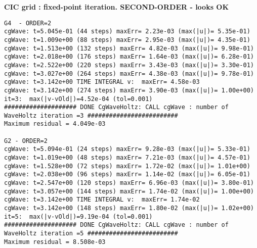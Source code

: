 \documentclass[preprint,11pt]{elsarticle}
\begin{document}
\bigskip
\textbf{CIC grid  : fixed-point iteration. SECOND-ORDER - looks OK}
\begin{Verbatim}[fontsize=\scriptsize]
G4  - ORDER=2
cgWave: t=5.045e-01 (44 steps) maxErr= 2.23e-03 (max(|u|)= 5.35e-01) 
cgWave: t=1.009e+00 (88 steps) maxErr= 2.95e-03 (max(|u|)= 4.35e-01) 
cgWave: t=1.513e+00 (132 steps) maxErr= 4.82e-03 (max(|u|)= 9.98e-01) 
cgWave: t=2.018e+00 (176 steps) maxErr= 1.64e-03 (max(|u|)= 6.28e-01) 
cgWave: t=2.522e+00 (220 steps) maxErr= 3.43e-03 (max(|u|)= 3.30e-01) 
cgWave: t=3.027e+00 (264 steps) maxErr= 4.38e-03 (max(|u|)= 9.78e-01) 
cgWave: t=3.142e+00 TIME INTEGRAL v:  maxErr= 4.58e-03
cgWave: t=3.142e+00 (274 steps) maxErr= 3.90e-03 (max(|u|)= 1.00e+00) 
it=3:  max(|v-vOld|)=4.52e-04 (tol=0.001)
#################### DONE CgWaveHoltz: CALL cgWave : number of WaveHoltz iteration =3 #########################
Maximum residual = 4.049e-03

G2 - ORDER=2
cgWave: t=5.094e-01 (24 steps) maxErr= 9.28e-03 (max(|u|)= 5.33e-01) 
cgWave: t=1.019e+00 (48 steps) maxErr= 7.21e-03 (max(|u|)= 4.57e-01) 
cgWave: t=1.528e+00 (72 steps) maxErr= 1.72e-02 (max(|u|)= 1.01e+00) 
cgWave: t=2.038e+00 (96 steps) maxErr= 1.14e-02 (max(|u|)= 6.05e-01) 
cgWave: t=2.547e+00 (120 steps) maxErr= 6.96e-03 (max(|u|)= 3.80e-01) 
cgWave: t=3.057e+00 (144 steps) maxErr= 1.74e-02 (max(|u|)= 1.00e+00) 
cgWave: t=3.142e+00 TIME INTEGRAL v:  maxErr= 1.74e-02
cgWave: t=3.142e+00 (148 steps) maxErr= 1.80e-02 (max(|u|)= 1.02e+00) 
it=5:  max(|v-vOld|)=9.19e-04 (tol=0.001)
#################### DONE CgWaveHoltz: CALL cgWave : number of WaveHoltz iteration =5 #########################
Maximum residual = 8.508e-03
\end{Verbatim}
\end{document}

